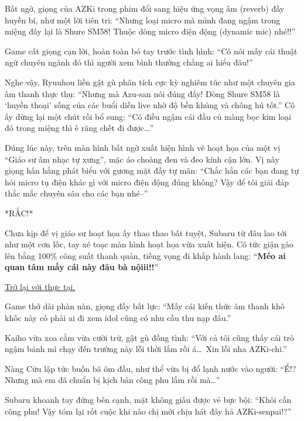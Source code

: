 \documentclass[../main.tex]{subfiles}
\begin{document}
Bất ngờ, giọng của AZKi trong phim đổi sang hiệu ứng vọng âm (reverb) đầy huyền bí, như một lời tiên tri: ``Nhưng loại micro mà mình đang ngậm trong miệng đây lại là Shure SM58! Thuộc dòng micro điện động (dynamic mic) nhé!!''

Game cất giọng cạn lời, hoàn toàn bó tay trước tình hình: ``Cô nói mấy cái thuật ngữ chuyên ngành đó thì người xem bình thường chẳng ai hiểu đâu!''

Nghe vậy, Ryuuhou liền gật gù phân tích cực kỳ nghiêm túc như một chuyên gia âm thanh thực thụ: ``Nhưng mà Azu-san nói đúng đấy! Dòng Shure SM58 là `huyền thoại' sống của các buổi diễn live nhờ độ bền khủng và chống hú tốt.'' Cô ấy dừng lại một chút rồi bổ sung: ``Có điều ngậm cái đầu củ màng bọc kim loại đó trong miệng thì ê răng chết đi được\dots''

Đúng lúc này, trên màn hình bất ngờ xuất hiện hình vẽ hoạt họa của một vị ``Giáo sư âm nhạc tự xưng'', mặc áo choàng đen và đeo kính cận lớn. Vị này giọng hấn hắng phát biểu với gương mặt đầy tự mãn: ``Chắc hẳn các bạn đang tự hỏi micro tụ điện khác gì với micro điện động đúng không? Vậy để tôi giải đáp thắc mắc chuyên sâu cho các bạn nhé--''

*RẮC!*

Chưa kịp để vị giáo sư hoạt họa ấy thao thao bất tuyệt, Subaru từ đâu lao tới như một cơn lốc, tay xé toạc màn hình hoạt họa vừa xuất hiện. Cô tức giận gào lên bằng 100\% công suất thanh quản, tiếng vọng đi khắp hành lang: ``\textbf{Méo ai quan tâm mấy cái này đâu bà nộiii!!}''


\ct

\begin{center}
  \uline{Trở lại với thực tại.}
\end{center}

Game thở dài phàn nàn, giọng đầy bất lực: ``Mấy cái kiến thức âm thanh khô khốc này có phải ai đi xem idol cũng có nhu cầu thu nạp đâu.''

Kaiho vừa xoa cằm vừa cười trừ, gật gù đồng tình: ``Với cả tôi cũng thấy cái trò ngậm bánh mì chạy đến trường này lỗi thời lắm rồi á\dots\ Xin lỗi nha AZKi-chi.''

Nàng Cừu lập tức buồn bã ôm đầu, như thể vừa bị đổ lạnh nước vào người: ``Ể!? Nhưng mà em đã chuẩn bị kịch bản công phu lắm rồi mà\dots''

Subaru khoanh tay đứng bên cạnh, mặt không giấu được vẻ bực bội: ``Khỏi cần công phu! Vậy tóm lại rốt cuộc khi nào chị mới chịu hát đây hả AZKi-senpai!?''
\end{document}
